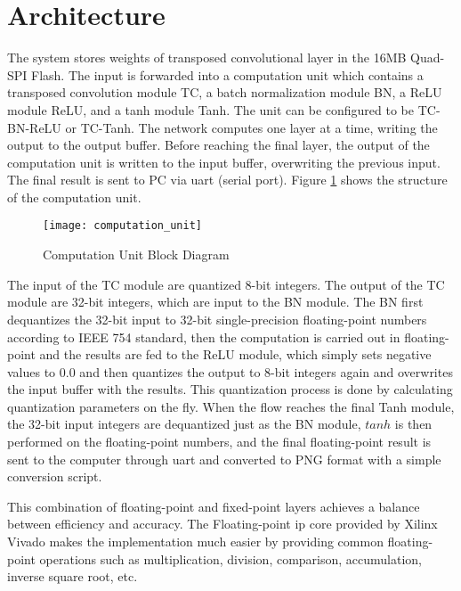 \section{Architecture}

The system stores weights of transposed convolutional layer in the 16MB Quad-SPI Flash. The input is
forwarded into a computation unit which contains a transposed convolution module TC,
a batch normalization module BN, a ReLU module ReLU, and a tanh module Tanh.
The unit can be configured to be TC-BN-ReLU or TC-Tanh. The network computes one
layer at a time, writing the output to the output buffer. Before reaching the final layer, the output of
the computation unit is written to the input buffer, overwriting the previous input. The final result is
sent to PC via \gls{uart} (serial port). Figure \ref{fig:computation_unit} shows the structure of the
computation unit.

\begin{figure}[h]
  \centering
  \texttt{[image: computation\_unit]}
  \caption{Computation Unit Block Diagram}
  \label{fig:computation_unit}
\end{figure}

The input of the TC module are quantized 8-bit integers. The output of the TC module are 32-bit
integers, which are input to the BN module. The BN first dequantizes the 32-bit input to 32-bit
single-precision floating-point numbers according to IEEE 754 standard, then the computation is carried
out in floating-point and the results are fed to the ReLU module, which simply sets negative values to
$0.0$ and then quantizes the output to 8-bit integers again and overwrites the input buffer with the
results. This quantization process is done by calculating quantization parameters on the fly.
When the flow reaches the final Tanh module, the 32-bit input integers are dequantized just as the
BN module, $tanh$ is then performed on the floating-point numbers, and the final floating-point result is
sent to the computer through \gls{uart} and converted to PNG format with a simple conversion script.

This combination of floating-point and fixed-point layers achieves a balance between efficiency and
accuracy. The Floating-point \gls{ip} core provided by Xilinx Vivado makes the implementation much easier
by providing common floating-point operations such as multiplication, division, comparison, accumulation,
inverse square root, etc.

\clearpage %
